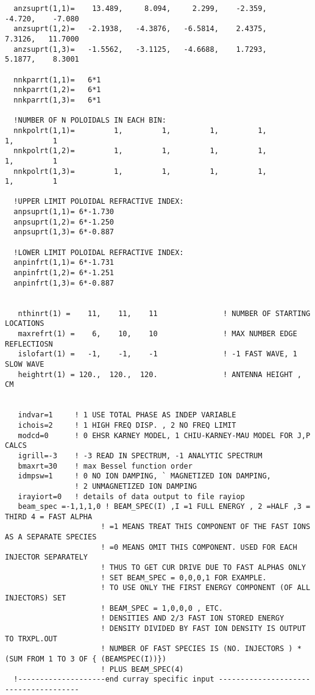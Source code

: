 \begin{verbatim}
  anzsuprt(1,1)=    13.489,     8.094,     2.299,    -2.359,    -4.720,    -7.080
  anzsuprt(1,2)=   -2.1938,   -4.3876,   -6.5814,    2.4375,    7.3126,   11.7000
  anzsuprt(1,3)=   -1.5562,   -3.1125,   -4.6688,    1.7293,    5.1877,    8.3001

  nnkparrt(1,1)=   6*1
  nnkparrt(1,2)=   6*1
  nnkparrt(1,3)=   6*1

  !NUMBER OF N POLOIDALS IN EACH BIN:
  nnkpolrt(1,1)=         1,         1,         1,         1,         1,         1
  nnkpolrt(1,2)=         1,         1,         1,         1,         1,         1
  nnkpolrt(1,3)=         1,         1,         1,         1,         1,         1

  !UPPER LIMIT POLOIDAL REFRACTIVE INDEX:
  anpsuprt(1,1)= 6*-1.730
  anpsuprt(1,2)= 6*-1.250
  anpsuprt(1,3)= 6*-0.887
 
  !LOWER LIMIT POLOIDAL REFRACTIVE INDEX:
  anpinfrt(1,1)= 6*-1.731
  anpinfrt(1,2)= 6*-1.251
  anpinfrt(1,3)= 6*-0.887 


   nthinrt(1) =    11,    11,    11               ! NUMBER OF STARTING LOCATIONS 
   maxrefrt(1) =    6,    10,    10               ! MAX NUMBER EDGE REFLECTIOSN
   islofart(1) =   -1,    -1,    -1               ! -1 FAST WAVE, 1 SLOW WAVE
   heightrt(1) = 120.,  120.,  120.               ! ANTENNA HEIGHT , CM


   indvar=1     ! 1 USE TOTAL PHASE AS INDEP VARIABLE
   ichois=2     ! 1 HIGH FREQ DISP. , 2 NO FREQ LIMIT
   modcd=0      ! 0 EHSR KARNEY MODEL, 1 CHIU-KARNEY-MAU MODEL FOR J,P CALCS
   igrill=-3    ! -3 READ IN SPECTRUM, -1 ANALYTIC SPECTRUM
   bmaxrt=30    ! max Bessel function order
   idmpsw=1     ! 0 NO ION DAMPING, ` MAGNETIZED ION DAMPING,
                ! 2 UNMAGNETIZED ION DAMPING
   irayiort=0   ! details of data output to file rayiop
   beam_spec =-1,1,1,0 ! BEAM_SPEC(I) ,I =1 FULL ENERGY , 2 =HALF ,3 = THIRD 4 = FAST ALPHA
                      ! =1 MEANS TREAT THIS COMPONENT OF THE FAST IONS AS A SEPARATE SPECIES
                      ! =0 MEANS OMIT THIS COMPONENT. USED FOR EACH INJECTOR SEPARATELY
                      ! THUS TO GET CUR DRIVE DUE TO FAST ALPHAS ONLY
                      ! SET BEAM_SPEC = 0,0,0,1 FOR EXAMPLE.
                      ! TO USE ONLY THE FIRST ENERGY COMPONENT (OF ALL INJECTORS) SET
                      ! BEAM_SPEC = 1,0,0,0 , ETC. 
                      ! DENSITIES AND 2/3 FAST ION STORED ENERGY
                      ! DENSITY DIVIDED BY FAST ION DENSITY IS OUTPUT TO TRXPL.OUT
                      ! NUMBER OF FAST SPECIES IS (NO. INJECTORS ) * (SUM FROM 1 TO 3 OF { (BEAMSPEC(I))})
                      ! PLUS BEAM_SPEC(4)
  !--------------------end curray specific input --------------------------------------

\end{verbatim}
\normalsize
